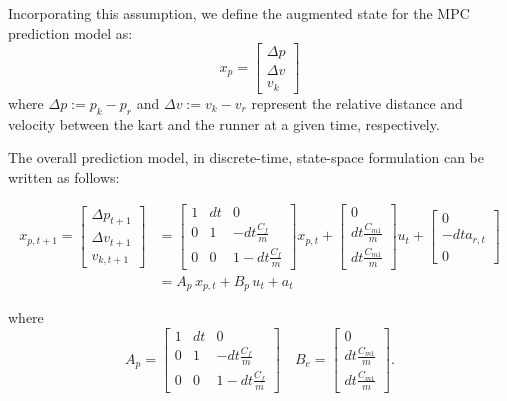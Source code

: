 \documentclass[a4paper,12pt,oneside]{book}
\begin{document}
Incorporating this assumption, we define the augmented state for the MPC prediction model as:
\begin{equation}
    x_p = 
    \begin{bmatrix}
        \Delta p  \\
        \Delta v \\
        v_k
    \end{bmatrix}
\end{equation}
where $\Delta p := p_k - p_r$ and $\Delta v := v_k - v_r$ represent the relative distance and velocity between the kart and the runner at a given time, respectively.

The overall prediction model, in discrete-time, state-space formulation can be written as follows:

\begin{equation}
\begin{aligned}
    x_{p,t+1} = 
        \begin{bmatrix}
            \Delta p_{t+1}  \\
            \Delta v_{t+1} \\
            v_{k,t+1}
        \end{bmatrix}
        & =
        \begin{bmatrix}
            1 & dt & 0 \\
            0 & 1 & -dt\frac{C_f}{m} \\
            0 & 0 & 1-dt\frac{C_f}{m}
        \end{bmatrix}
        x_{p,t}
        +
        \begin{bmatrix}
            0 \\
            dt \frac{C_{m1}}{m} \\
            dt \frac{C_{m1}}{m}
        \end{bmatrix}
        u_t + 
        \begin{bmatrix}
        0 \\
        - dt a_{r,t} \\
        0
        \end{bmatrix} \\
        & = A_p \, x_{p,t} + B_p \, u_t + a_t
\end{aligned}
\label{Prediction_model_MPC}
\end{equation}

where
\begin{equation}
    A_p =
        \begin{bmatrix}
            1 & dt & 0 \\
            0 & 1 & -dt\frac{C_f}{m} \\
            0 & 0 & 1-dt\frac{C_f}{m}
        \end{bmatrix}
    \quad
    B_e = 
        \begin{bmatrix}
            0 \\
            dt \frac{C_{m1}}{m} \\
            dt \frac{C_{m1}}{m}
        \end{bmatrix}.
\label{Prediction_matrices}
\end{equation}
\end{document}
